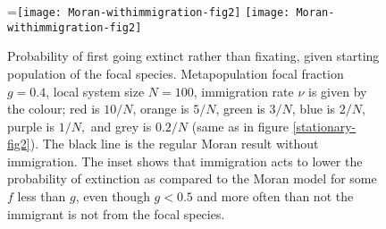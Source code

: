 \begin{figure}[ht]
	\centering
	=\hbox{\texttt{[image: Moran-withimmigration-fig2]}}
	\texttt{[image: Moran-withimmigration-fig2]}
	\caption{Probability of first going extinct rather than fixating, given starting population of the focal species. Metapopulation focal fraction $g=0.4$, local system size $N=100$, immigration rate $\nu$ is given by the colour; red is $10/N$, orange is $5/N$, green is $3/N$, blue is $2/N$, purple is $1/N,$ and grey is $0.2/N$ (same as in figure \ref{stationary-fig2}). The black line is the regular Moran result without immigration. The inset shows that immigration acts to lower the probability of extinction as compared to the Moran model for some $f$ less than $g$, even though $g<0.5$ and more often than not the immigrant is not from the focal species. } \label{extnprobfig-ihope}
\end{figure}%
\iffalse
\begin{figure}[ht]
	\centering
	\texttt{[image: Moran-withimmigration-extinctionprob]}
	\caption{Probability of first going extinct rather than fixating, given starting population of the focal species. The parameters are $g=0.4$ and $N=100$, with $\nu$ and colours the same as in figure \ref{stationary-fig2}. The black line is the regular Moran result without immigration. } \label{extnprobfig}
\end{figure}
\begin{figure}[ht]
	\centering
	\texttt{[image: Moran-withimmigration-extinctionprob-zoomed]}
	\caption{Probability of first going extinct, given starting population/fraction. $g=0.4$, $N=100$, $\nu$ and colours as in figure \ref{stationary-fig2}. Black is the regular Moran result without immigration. }
\end{figure}
\fi


